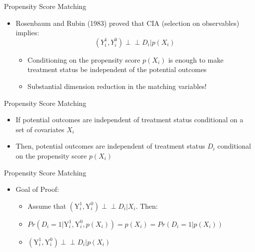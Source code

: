 \documentclass[dvipsnames,hyperref={pdfpagelabels=false}]{beamer}
\newcommand{\indep}{\perp\!\!\!\perp}
\begin{document}
\begin{frame}{Propensity Score Matching}
\begin{itemize}

\item Rosenbaum and Rubin (1983) proved that CIA (selection on observables) implies:
	\begin{equation*}
	(Y^{1}_{i},Y^{0}_{i})\indep D_{i}|p(X_{i})
	\end{equation*}
\begin{itemize}
\item Conditioning on the propensity score $p(X_{i})$ is enough to make treatment status be independent of the potential outcomes
\vspace{0.2cm}
\item Substantial dimension reduction in the matching variables!
\end{itemize}
\end{itemize}
\end{frame}


\begin{frame}{Propensity Score Matching}
\begin{itemize}

\begin{block}{Propensity Score Theorem}
Suppose the CIA holds, such that $ (\mathrm{Y}^{1}_{i},\mathrm{Y}^{0}_{i})\indep D_{i}|X_{i}$. Then $ (\mathrm{Y}^{1}_{i},\mathrm{Y}^{0}_{i})\indep D_{i}|p(X_{i})$
\end{block}

\item If potential outcomes are independent of treatment status
conditional on a set of covariates $X_{i}$
\vspace{0.2cm}
\item Then, potential outcomes are independent of treatment status $D_{i}$ conditional on the propensity score $p(X_{i})$
\end{itemize}
\end{frame}


\begin{frame}{Propensity Score Matching}
		\begin{itemize}
	\item Goal of Proof: 
	
	\begin{itemize}
	\item Assume that $ (\mathrm{Y}^{1}_{i},\mathrm{Y}^{0}_{i})\indep D_{i}|X_{i}$. Then:
		\vspace{0.2cm}
		\item[$\Rightarrow$] $Pr(D_{i}=1|\mathrm{Y}^{1}_{i},\mathrm{Y}^{0}_{i},p(X_{i}))=p(X_{i})=Pr(D_{i}=1|p(X_{i}))$
		\vspace{0.2cm}
		\item[$\Rightarrow$] $(\mathrm{Y}^{1}_{i},\mathrm{Y}^{0}_{i})\indep D_{i}|p(X_{i})$
	\end{itemize}
	
		\end{itemize}
\end{frame}
\end{document}
